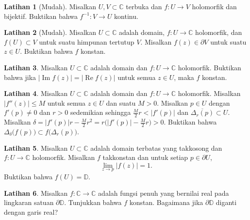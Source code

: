 \documentclass[12pt,openany]{book}
\renewcommand{\Re}{\operatorname{Re}}
\renewcommand{\Im}{\operatorname{Im}}
\newcommand{\sabs}[1]{\lvert {#1} \rvert}
\newcommand{\abs}[1]{\left\lvert {#1} \right\rvert}
\newcommand{\C}{{\mathbb{C}}}
\newcommand{\D}{{\mathbb{D}}}
\theoremstyle{plain}
\theoremstyle{remark}
\theoremstyle{definition}
\newenvironment{exbox}{%
    \def\FrameCommand{\vrule width 1pt \relax\hspace{10pt}}%
    \MakeFramed{\advance\hsize-\width\FrameRestore}%
}{%
    \endMakeFramed
}
\theoremstyle{exercise}
\newtheorem{exercise}{Latihan}[section]
\theoremstyle{example}
\begin{document}
\begin{exbox}
\begin{exercise}[Mudah]
Misalkan $U,V \subset \C$ terbuka dan $f \colon U \to V$ holomorfik
dan bijektif.  Buktikan bahwa $f^{-1} \colon V \to U$ kontinu.
\end{exercise}

\begin{exercise}[Mudah]
Misalkan $U \subset \C$ adalah domain, $f \colon U \to \C$ holomorfik,
dan $f(U) \subset V$ untuk suatu himpunan tertutup $V$.
Misalkan $f(z) \in \partial V$
untuk suatu $z \in U$.  Buktikan bahwa $f$ konstan.
\end{exercise}

\begin{exercise}
Misalkan $U \subset \C$ adalah domain dan $f \colon U \to \C$ holomorfik.
Buktikan bahwa jika $\abs{\Im f(z)} = \abs{\Re f(z)}$
untuk semua $z \in U$,
maka $f$ konstan.
\end{exercise}

\begin{exercise}
Misalkan $U \subset \C$ adalah domain dan $f \colon U \to \C$ holomorfik.
Misalkan $\sabs{f''(z)} \leq M$ untuk semua $z \in U$ dan suatu $M > 0$.
Misalkan $p \in U$ dengan $f'(p) \neq 0$ dan $r > 0$ sedemikian sehingga
$\frac{M}{2}r < \sabs{f'(p)}$ dan $\overline{\Delta_r(p)} \subset U$.
Misalkan $\delta = \sabs{f'(p)}r - \frac{M}{2} r^2
= r\bigl(\sabs{f'(p)} - \frac{M}{2} r\bigr) > 0$.  Buktikan bahwa
$\Delta_{\delta}\bigl(f(p)\bigr) \subset f\bigl( \Delta_r(p) \bigr)$.
\end{exercise}

\begin{exercise}
Misalkan $U \subset \C$ adalah domain terbatas yang takkosong dan
$f \colon U \to \C$ holomorfik.
Misalkan $f$ takkonstan dan untuk setiap $p \in \partial U$,
\begin{equation*}
\lim_{z \to p} \abs{f(z)}=1 .
\end{equation*}
Buktikan bahwa $f(U) = \D$.
\end{exercise}

\begin{exercise}
Misalkan $f \colon \C \to \C$ adalah fungsi penuh 
yang bernilai real pada lingkaran satuan $\partial \D$.  Tunjukkan bahwa $f$
konstan.  Bagaimana jika $\partial \D$ diganti dengan garis real?
\end{exercise}
\end{exbox}



\end{document}
